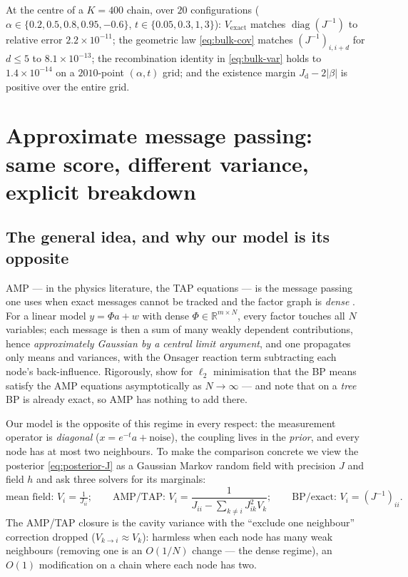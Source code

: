 \documentclass[11pt]{article}
\theoremstyle{definition}
\newcommand{\R}{\mathbb{R}}
\newcommand{\Jd}{J_{\mathrm d}}
\DeclareMathOperator{\diag}{diag}
\begin{document}
\begin{auditbox}
At the centre of a $K=400$ chain, over $20$ configurations
($\alpha\in\{0.2,0.5,0.8,0.95,-0.6\}$, $t\in\{0.05,0.3,1,3\}$):
$V_{\mathrm{exact}}$ matches $\diag(J^{-1})$ to relative error
$2.2\times10^{-11}$; the geometric law \eqref{eq:bulk-cov} matches
$(J^{-1})_{i,i+d}$ for $d\le5$ to $8.1\times10^{-13}$; the recombination
identity in \eqref{eq:bulk-var} holds to $1.4\times10^{-14}$ on a
$2010$-point $(\alpha,t)$ grid; and the existence margin $\Jd-2|\beta|$ is
positive over the entire grid.
\end{auditbox}

\section{Approximate message passing: same score, different variance,
explicit breakdown}\label{sec:amp}

\subsection{The general idea, and why our model is its opposite}

AMP --- in the physics literature, the TAP equations --- is the message
passing one uses when exact messages cannot be tracked and the factor graph is
\emph{dense} \citep{zdeborova2021statistical,donoho2009message,
mezard2009information}. For a linear model $y=\Phi a+w$ with dense
$\Phi\in\R^{m\times N}$, every factor touches all $N$ variables; each message
is then a sum of many weakly dependent contributions, hence \emph{approximately
Gaussian by a central limit argument}, and one propagates only means and
variances, with the Onsager reaction term subtracting each node's
back-influence. Rigorously, \citet{genovese2026amp} show for $\ell_2$
minimisation that the BP means satisfy the AMP equations asymptotically as
$N\to\infty$ --- and note that on a \emph{tree} BP is already exact, so AMP
has nothing to add there.

Our model is the opposite of this regime in every respect: the measurement
operator is \emph{diagonal} ($x=e^{-t}a+\text{noise}$), the coupling lives in
the \emph{prior}, and every node has at most two neighbours. To make the
comparison concrete we view the posterior \eqref{eq:posterior-J} as a Gaussian
Markov random field with precision $J$ and field $h$ and ask three solvers
for its marginals:
\[
 \text{mean field: } V_i=\tfrac1{J_{ii}};\qquad
 \text{AMP/TAP: } V_i=\frac{1}{J_{ii}-\sum_{k\ne i}J_{ik}^2 V_k};\qquad
 \text{BP/exact: } V_i=(J^{-1})_{ii}.
\]
The AMP/TAP closure is the cavity variance with the ``exclude one neighbour''
correction dropped ($V_{k\to i}\approx V_k$): harmless when each node has many
weak neighbours (removing one is an $O(1/N)$ change --- the dense regime), an
$O(1)$ modification on a chain where each node has two.
\end{document}
